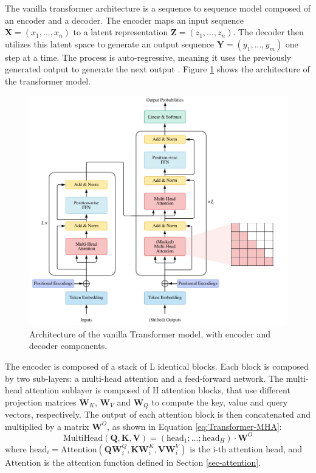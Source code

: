 The vanilla transformer architecture is a sequence to sequence model composed of an encoder and a decoder. The encoder maps an input sequence $\boldsymbol{X} = (x_1,...,x_n)$ to a latent representation $\boldsymbol{Z} = (z_1,...,z_n)$. The decoder then utilizes this latent space to generate an output sequence $\boldsymbol{Y} = (y_1,...,y_m)$ one step at a time. The process is auto-regressive, meaning it uses the previously generated output to generate the next output \cite{vaswani2023attentionneed}. Figure \ref{fig:Transformer-arch} shows the architecture of the transformer model.

\begin{figure}[H]
    \centering
    \includegraphics[width=12cm]{Cap2_LitReview/model_basics/Transformers/transformer_arch.png}
    \caption{Architecture of the vanilla Transformer model, with encoder and decoder components. \cite{lin2021surveytransformers}}
    \label{fig:Transformer-arch}
\end{figure}

The encoder is composed of a stack of L identical blocks. Each block is composed by two sub-layers: a multi-head attention and a feed-forward network. The multi-head attention sublayer is composed of H attention blocks, that use different projection matrices $\boldsymbol{W}_K$, $\boldsymbol{W}_V$ and $\boldsymbol{W}_Q$ to compute the key, value and query vectors, respectively. The output of each attention block is then concatenated and multiplied by a matrix $\boldsymbol{W}^O$, as shown in Equation \ref{eq:Transformer-MHA}:
\begin{equation}
    \text{MultiHead}(\boldsymbol{Q}, \boldsymbol{K}, \boldsymbol{V}) = \left(\text{head}_1;...;\text{head}_H\right) \cdot \boldsymbol{W}^O 
    \label{eq:Transformer-MHA}
\end{equation}
where $\text{head}_i = \text{Attention}(\boldsymbol{Q}\boldsymbol{W}_{i}^{Q}, \boldsymbol{K}\boldsymbol{W}_{i}^{K}, \boldsymbol{V}\boldsymbol{W}_{i}^{V})$ is the i-th attention head, and $\text{Attention}$ is the attention function defined in Section \ref{sec-attention}. 


